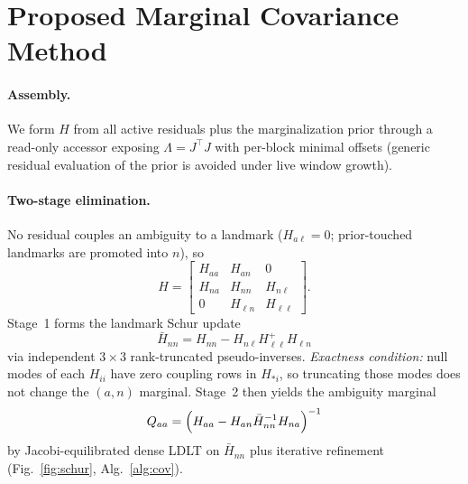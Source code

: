 \documentclass[letterpaper, journal, twocolumn]{IEEEtran}
\begin{document}
\section{Proposed Marginal Covariance Method}
\label{sec:method}

\paragraph{Assembly.}
We form $H$ from all active residuals plus the marginalization prior through a
read-only accessor exposing $\Lambda=J^\top J$ with per-block minimal offsets
(generic residual evaluation of the prior is avoided under live window growth).

\paragraph{Two-stage elimination.}
No residual couples an ambiguity to a landmark ($H_{a\ell}=0$; prior-touched
landmarks are promoted into $n$), so
\begin{equation}
H=\begin{bmatrix}
H_{aa} & H_{an} & 0 \\
H_{na} & H_{nn} & H_{n\ell} \\
0 & H_{\ell n} & H_{\ell\ell}
\end{bmatrix}.
\end{equation}
Stage~1 forms the landmark Schur update
\begin{equation}
\bar H_{nn}=H_{nn}-H_{n\ell}H_{\ell\ell}^{+}H_{\ell n}
\end{equation}
via independent $3\times3$ rank-truncated pseudo-inverses.
\emph{Exactness condition:} null modes of each $H_{ii}$ have zero coupling
rows in $H_{\ast i}$, so truncating those modes does not change the
$(a,n)$ marginal.
Stage~2 then yields the ambiguity marginal
\begin{equation}
\label{eq:qaa-schur}
Q_{aa}=\Bigl(H_{aa}-H_{an}\bar H_{nn}^{-1}H_{na}\Bigr)^{-1}
\end{equation}
by Jacobi-equilibrated dense LDLT on $\bar H_{nn}$ plus iterative refinement
(Fig.~\ref{fig:schur}, Alg.~\ref{alg:cov}).
\end{document}
